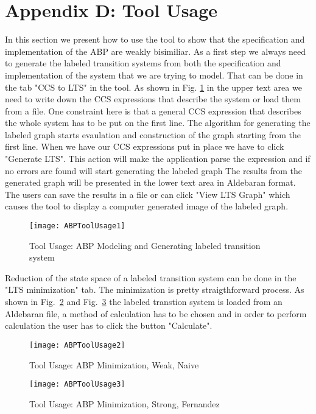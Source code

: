\section*{Appendix D: Tool Usage}
\label{appendixD}

In this section we present how to use the tool to show that the specification and 
implementation of the ABP are weakly bisimiliar. As a first step we always need to
generate the labeled transition systems from both the specification and implementation of the system that
we are trying to model. That can be done in the tab "CCS to LTS" in the tool. As shown
in Fig. \ref{fig:abptoolusage1} in the upper text area we need to write down the CCS 
expressions that describe the system or load them from a file. One constraint here
is that a general CCS expression that describes the whole system has to be put on
the first line. The algorithm for generating the labeled graph starts evaulation and 
construction of the graph starting from the first line. When we have our CCS expressions
put in place we have to click "Generate LTS". This action will make the application
parse the expression and if no errors are found will start generating the labeled graph
The results from the generated graph will be presented in the lower text area in 
Aldebaran format. The users can save the results in a file or can click "View LTS Graph" 
which causes the tool to display a computer generated image of the labeled graph.

\begin{figure}[h]
\centering
\texttt{[image: ABPToolUsage1]}
\caption{Tool Usage: ABP Modeling and Generating labeled transition system}
\label{fig:abptoolusage1}
\end{figure}

Reduction of the state space of a labeled transition system can be done in the "LTS minimization" tab. The minimization is pretty 
straigthforward process. As shown in Fig.~\ref{fig:abptoolusage2} and Fig.~\ref{fig:abptoolusage3}
the labeled transtion system is loaded from an Aldebaran file, a method of calculation has to be chosen and in order to perform
calculation the user has to click the button "Calculate".

\begin{figure}[h]
\centering
\texttt{[image: ABPToolUsage2]}
\caption{Tool Usage: ABP Minimization, Weak, Naive}
\label{fig:abptoolusage2}
\end{figure}

\begin{figure}[h]
\centering
\texttt{[image: ABPToolUsage3]}
\caption{Tool Usage: ABP Minimization, Strong, Fernandez}
\label{fig:abptoolusage3}
\end{figure}


